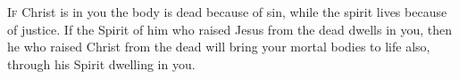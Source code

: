 
\lettrine{I}{f} Christ is in you the body is dead because of sin, while the spirit lives because of justice. If the Spirit of him who raised Jesus from the dead dwells in you, then he who raised Christ from the dead will bring your mortal bodies to life also, through his Spirit dwelling in you.